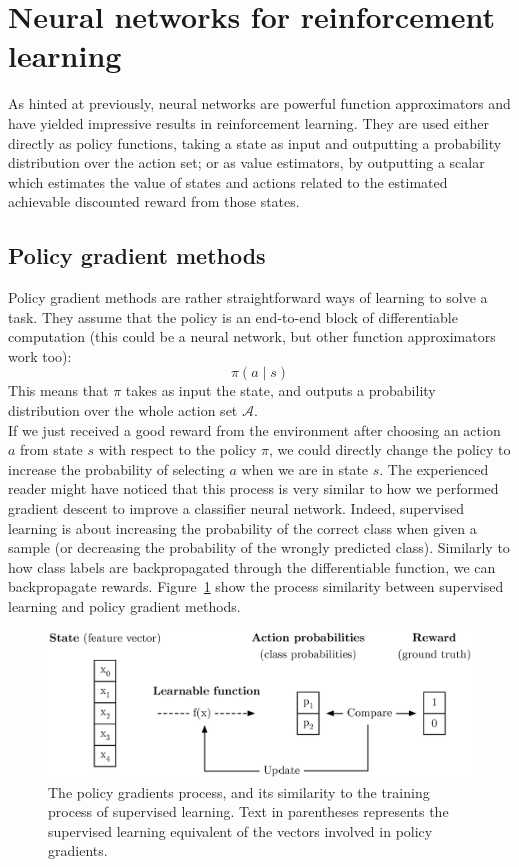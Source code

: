 \section{Neural networks for reinforcement learning}
As hinted at previously, neural networks are powerful function approximators and
have yielded impressive results in reinforcement learning. They are used either
directly as policy functions, taking a state as input and outputting a
probability distribution over the action set; or as value estimators, by 
outputting a scalar which estimates the value of states and actions related to the
estimated achievable discounted reward from those states.

\subsection{Policy gradient methods}
Policy gradient methods are rather straightforward ways of learning to solve a task.
They assume that the policy is an end-to-end block of differentiable computation
(this could be a neural network, but other function approximators work too):
$$\pi(a \mid s)$$
This means that $\pi$ takes as input the state, and outputs a probability
distribution over the whole action set $\mathcal{A}$.\\

If we just received a good reward from the environment after choosing an action
$a$ from state $s$
with respect to the policy $\pi$, we could directly change the policy to 
increase the probability of selecting $a$ when we are in state $s$. The
experienced reader might have noticed that this process is very similar to
how we performed gradient descent to improve a classifier neural network. 
Indeed, supervised learning is about increasing the probability of the correct
class when given a sample (or decreasing the probability of the wrongly
predicted class). Similarly to how class labels are backpropagated through
the differentiable function, we can backpropagate rewards.
Figure~\ref{fig:supervised_vs_pg} show the process similarity between 
supervised learning and policy gradient methods.\\


\begin{figure}
	\centering
	\includegraphics[width=0.8\linewidth]{fig/supervised_vs_pg.eps}
	\caption{The policy gradients process, and its similarity to
	the training process of supervised learning. Text in parentheses
	represents the supervised learning equivalent of the vectors 
	involved in policy gradients.}
	\label{fig:supervised_vs_pg}
\end{figure}

